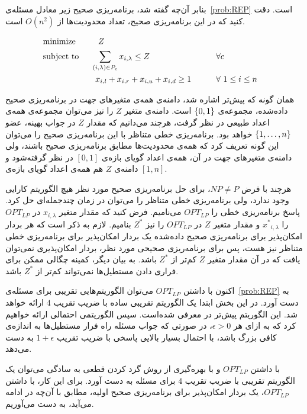 
بنابر آن‌چه گفته شد، برنامه‌ریزی صحیح زیر معادل مسئله‌ی~\ref{prob:REP} است. دقت کنید که در این برنامه‌ریزی صحیح، تعداد محدودیت‌ها از $O(n ^ 2)$ است.
\begin{latin}
\begin{alignat}{3}
    & \text{minimize}  \quad && \ Z \notag \\
    & \text{subject to}  \quad 
		&& \!\!{\sum_{(i,\lambda) \in P_c} x_{i,\lambda} \leq Z} && \qquad {\forall c} \notag \\
    		&&& {x_{i,l} + x_{i,r} + x_{i,u} + x_{i,d} \geq 1} && \qquad {\forall\ 1 \le i \le n} \notag
\end{alignat}
\end{latin}
همان گونه که پیش‌تر اشاره شد، دامنه‌ی همه‌ی متغیر‌های جهت در برنامه‌ریزی صحیح داده‌شده، مجموعه‌ی ${\{ 0, 1 \}}$ است. دامنه‌ی متغیر $Z$ را نیز می‌توان مجموعه‌ی همه‌ی اعداد طبیعی در نظر گرفت، هرچند می‌دانیم که مقدار $Z$ در جواب بهینه، عضو ${\{ 1, \ldots, n \}}$ خواهد بود. برنامه‌ریزی خطی متناظر با این برنامه‌ریزی صحیح را می‌توان این گونه تعریف کرد که همه‌ی محدودیت‌ها مطابق برنامه‌ریزی صحیح باشند، ولی دامنه‌ی متغیر‌های جهت در آن، همه‌ی اعداد گویای بازه‌ی $[0, 1]$ در نظر گرفته‌شود و دامنه‌ی $Z$ هم همه‌ی اعداد گویای بازه‌ی $[1, n]$.

هر‌چند با فرض $NP \neq P$، برای حل برنامه‌ریزی صحیح مورد نظر هیچ الگوریتم کارایی وجود ندارد، ولی برنامه‌ریزی خطی متناظر را می‌توان در زمان چند‌جمله‌ای حل کرد. پاسخ برنامه‌ریزی خطی را $OPT_{LP}$ می‌نامیم. فرض کنید که مقدار متغیر $x_{i, \lambda}$ در $OPT_{LP}$ را ${x^{*}}_{i, \lambda}$ و مقدار متغیر $Z$ در $OPT_{LP}$ را نیز $Z^{*}$ بنامیم. لازم به ذکر است که هر بردار امکان‌پذیر برای برنامه‌ریزی صحیح داده‌شده یک بردار امکان‌پذیر برای برنامه‌ریزی خطی متناظر نیز هست، پس برای برنامه‌ریزی صحیحی مورد نظر، بردار امکان‌پذیری نمی‌توان یافت که در آن مقدار متغیر $Z$ کم‌تر از $Z^{*}$ باشد. به بیان دیگر، کمینه چگالی ممکن برای فراری دادن مستطیل‌ها  نمی‌تواند کم‌تر از  $Z^{*}$ باشد.

اکنون با داشتن $OPT_{LP}$ می‌توان الگوریتم‌هایی تقریبی برای مسئله‌ی~\ref{prob:REP} به دست آورد. در این بخش ابتدا یک الگوریتم تقریبی ساده با ضریب تقریب $4$ ارائه خواهد شد. این الگوریتم پیش‌تر در \cite{REP} معرفی شده‌است. سپس الگوریتمی احتمالی ارائه خواهیم کرد که به ازای هر $\epsilon > 0$، در صورتی که جواب مسئله راه فرار مستطیل‌ها به اندازه‌ی کافی بزرگ باشد، با احتمال بسیار بالایی پاسخی با ضریب تقریب $1 + \epsilon$ به دست می‌دهد.


با داشتن $OPT_{LP}$ و با بهره‌گیری از روش گرد کردن قطعی به سادگی می‌توان یک الگوریتم تقریبی با ضریب تقریب $4$ برای مسئله به دست آورد. برای این کار، با داشتن $OPT_{LP}$، یک بردار امکان‌پذیر برای برنامه‌ریزی صحیح اولیه، مطابق با آن‌چه در ادامه می‌آید، به دست می‌آوریم.

